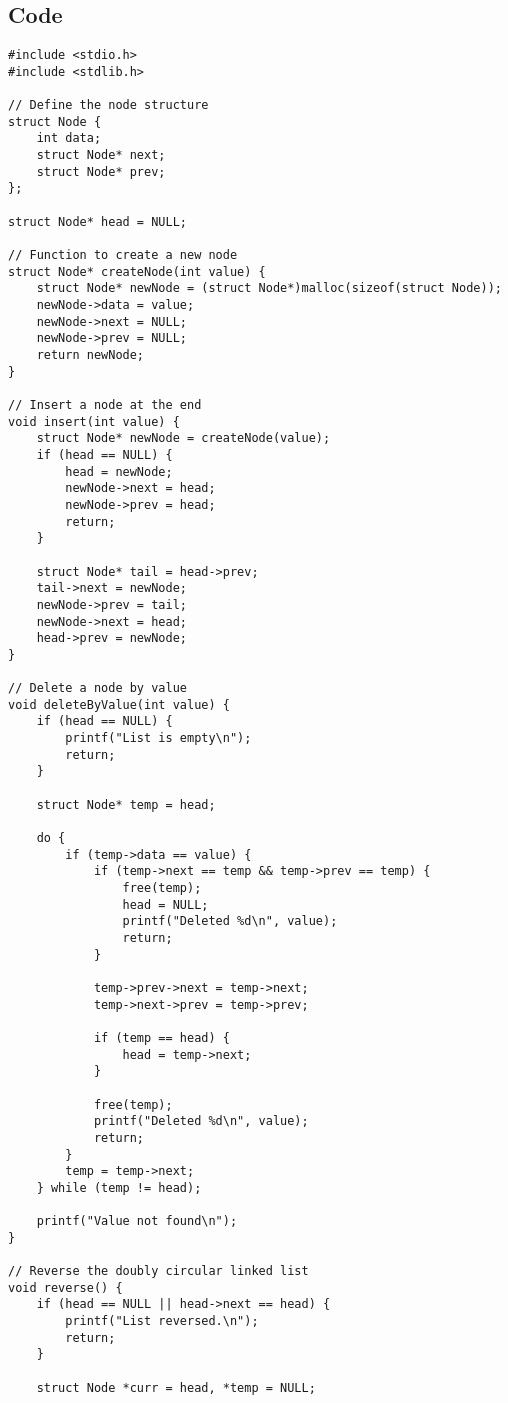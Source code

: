 \documentclass[12pt,a4paper]{article}
\begin{document}
\subsection*{Code}
\begin{lstlisting}
#include <stdio.h>
#include <stdlib.h>

// Define the node structure
struct Node {
    int data;
    struct Node* next;
    struct Node* prev;
};

struct Node* head = NULL;

// Function to create a new node
struct Node* createNode(int value) {
    struct Node* newNode = (struct Node*)malloc(sizeof(struct Node));
    newNode->data = value;
    newNode->next = NULL;
    newNode->prev = NULL;
    return newNode;
}

// Insert a node at the end
void insert(int value) {
    struct Node* newNode = createNode(value);
    if (head == NULL) {
        head = newNode;
        newNode->next = head;
        newNode->prev = head;
        return;
    }

    struct Node* tail = head->prev;
    tail->next = newNode;
    newNode->prev = tail;
    newNode->next = head;
    head->prev = newNode;
}

// Delete a node by value
void deleteByValue(int value) {
    if (head == NULL) {
        printf("List is empty\n");
        return;
    }

    struct Node* temp = head;

    do {
        if (temp->data == value) {
            if (temp->next == temp && temp->prev == temp) {
                free(temp);
                head = NULL;
                printf("Deleted %d\n", value);
                return;
            }

            temp->prev->next = temp->next;
            temp->next->prev = temp->prev;

            if (temp == head) {
                head = temp->next;
            }

            free(temp);
            printf("Deleted %d\n", value);
            return;
        }
        temp = temp->next;
    } while (temp != head);

    printf("Value not found\n");
}

// Reverse the doubly circular linked list
void reverse() {
    if (head == NULL || head->next == head) {
        printf("List reversed.\n");
        return;
    }

    struct Node *curr = head, *temp = NULL;


\end{lstlisting}
\end{document}
